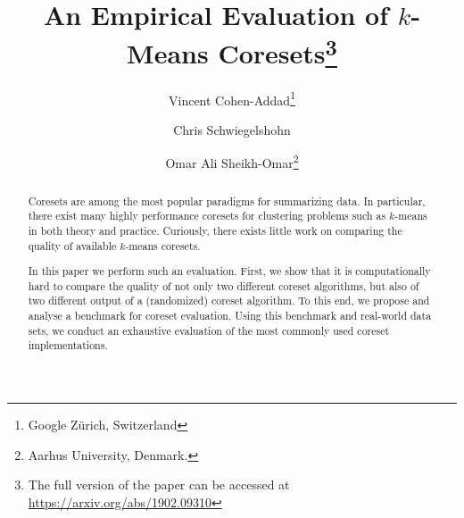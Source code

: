 \documentclass[twoside,leqno,twocolumn]{article}
\begin{document}
%
\newcommand\relatedversion{}
\renewcommand\relatedversion{\thanks{The full version of the paper can be accessed at \protect\url{https://arxiv.org/abs/1902.09310}}} %



\title{\Large An Empirical Evaluation of $k$-Means Coresets\relatedversion}
\author{Vincent Cohen-Addad\thanks{Google Z\"urich, Switzerland} \and Chris Schwiegelshohn \and Omar Ali Sheikh-Omar\thanks{Aarhus University, Denmark.}
}

\date{}

\maketitle







\begin{abstract}  
Coresets are among the most popular paradigms for summarizing data. In particular, there exist many highly performance coresets for clustering problems such as $k$-means in both theory and practice. Curiously, there exists little work on comparing the quality of available $k$-means coresets. 

In this paper we perform such an evaluation. First, we show that it is computationally hard to compare the quality of not only two different coreset algorithms, but also of two different output of a (randomized) coreset algorithm. To this end, we propose and analyse a benchmark for coreset evaluation. Using this benchmark and real-world data sets, we conduct an exhaustive evaluation of the most commonly used coreset implementations.
\end{abstract}
\end{document}

